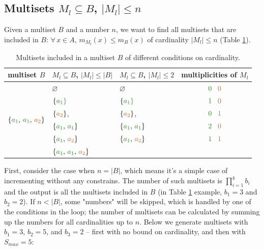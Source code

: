 \documentclass[12pt]{article}
\begin{document}
\subsection{Multisets $M_l \subseteq B$, $|M_l| \leqslant n$}

Given a multiset $B$ and a number $n$, we want to find all multisets that are included in $B$: $\forall \, x \in A, \, m_{M_l}(x) \leqslant m_B(x)$ of cardinality $|M_l| \leqslant n$ (Table \ref{tab:ex2}). \\

\begin{table}
  \centering
  \begin{tabular}{| c | l | l | c |}
    \hline
    \rowcolor{bg} 
      multiset $B$ & $M_l \subseteq B$, $|M_l| \leqslant |B|$ & 
                     $M_l \subseteq B$, $|M_l| \leqslant 2$   & 
                     multiplicities of $M_l$                                  \\
    \hline
    \multirow{6}{*}{$\{{\color{c1} a_1}, \, {\color{c1} a_1}, \, 
                       {\color{c2} a_2}\}$} 
    & $\varnothing$ & $\varnothing$ & ${\color{c1}0} \;\;\; {\color{c2}0}$    \\         & $\{\color{c1}a_1\}$ & $\{\color{c1}a_1\}$ 
    & ${\color{c1}1} \;\;\; {\color{c2}0}$                                    \\ 
    & $\{{\color{c2}a_2}\}$, & $\{{\color{c2}a_2}\}$, 
    & ${\color{c1}0} \;\;\; {\color{c2}1}$                                    \\ 
    & $\{{\color{c1}a_1}, \, {\color{c1}a_1}\}$  
    & $\{{\color{c1}a_1}, \, {\color{c1}a_1}\}$  
    & ${\color{c1}2} \;\;\; {\color{c2}0}$                                    \\           & $\{{\color{c1}a_1}, \, {\color{c2}a_2}\}$  
    & $\{{\color{c1}a_1}, \, {\color{c2}a_2}\}$ 
    & ${\color{c1} 1} \;\;\; {\color{c2} 1}$                                  \\  
    \cline{3-4}          
    & $\{{\color{c1}a_1}, \, {\color{c1}a_1}, \, {\color{c2}a_2}\}$ 
    & \cellcolor{Gainsboro} 
    & \cellcolor{Gainsboro}{${\color{c1}2} \;\;\; {\color{c2}1}$}             \\
    \hline    
  \end{tabular}
  \caption{Multisets included in a multiset $B$ of different conditions on cardinality.}
  \label{tab:ex2}
\end{table}  

First, consider the case when $n = |B|$, which means it's a simple case of incrementing without any constrains. The number of such multisets is $\prod_{i = 1}^k b_i$ and the output is all the multisets included in $B$ (in Table \ref{tab:ex2} example, $b_1 = 3$ and $b_2 = 2$). If $n < |B|$, some "numbers" will be skipped, which is handled by one of the conditions in the loop; the number of multisets can be calculated by summing up the numbers for all cardinalities up to $n$. Below we generate multisets with $b_1 = 3$, $b_2 = 5$, and $b_3 = 2$ -- first with no bound on cardinality, and then with $S_{max} = 5$:
      
\end{document}
